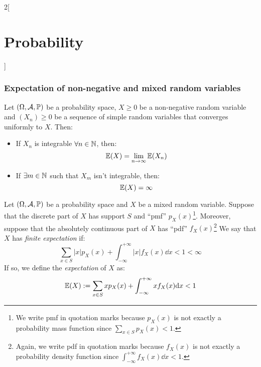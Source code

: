 \documentclass[../../../main.tex]{subfiles}
\begin{document}
\begin{multicols}{2}[\section{Probability}]
    \subsubsection{Expectation of non-negative and mixed random variables}
    \begin{prop}
        Let $(\Omega,\mathcal{A},\mathbb{P})$ be a probability space, $X\geq 0$ be a non-negative random variable and $(X_n)\geq 0$ be a sequence of simple random variables that converges uniformly to $X$. Then:
        \begin{itemize}
            \item If $X_n$ is integrable $\forall n\in\mathbb{N}$, then: $$\mathbb{E}(X)=\lim_{n\to\infty}\mathbb{E}(X_n)$$
            \item If $\exists m\in\mathbb{N}$ such that $X_m$ isn't integrable, then: $$\mathbb{E}(X)=\infty$$
        \end{itemize}
    \end{prop}
    \begin{definition}
        Let $(\Omega,\mathcal{A},\mathbb{P})$ be a probability space and $X$ be a mixed random variable. Suppose that the discrete part of $X$ has support $S$ and ``pmf'' $p_X(x)$\footnote{We write pmf in quotation marks because $p_X(x)$ is not exactly a probability mass function since $\sum_{x\in S}p_X(x)<1$.}. Moreover, suppose that the absolutely continuous part of $X$ has ``pdf'' $f_X(x)$\footnote{Again, we write pdf in quotation marks because $f_X(x)$ is not exactly a probability density function since $\int_{-\infty}^{+\infty}f_X(x)\dd x<1$.} We say that $X$ has \textit{finite expectation} if: $$\sum_{x\in S}|x|p_X(x)+\int_{-\infty}^{+\infty}|x|f_X(x)\dd x<1<\infty$$
        If so, we define the \textit{expectation} of $X$ as: $$\mathbb{E}(X):=\sum_{x\in S}xp_X(x)+\int_{-\infty}^{+\infty}xf_X(x)\dd x<1$$
    \end{definition}

\end{multicols}
\end{document}
